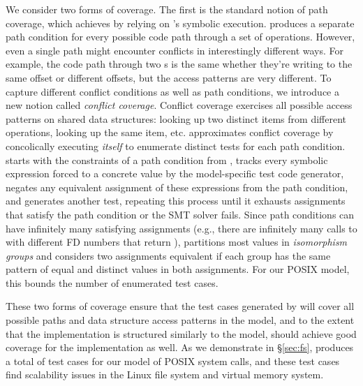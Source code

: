 We consider two forms of coverage.
The first is the standard notion of path coverage, which \generator{}
achieves by relying on \analyzer{}'s symbolic execution.
%
\analyzer{} produces a separate path condition for every possible code
path through a set of operations.
%
However, even a single path might encounter conflicts in interestingly
different ways.
%
For example, the code path through two s is the
same whether they're writing to the same offset or different offsets,
but the access patterns are very different.
%
To capture different conflict conditions as well as path conditions, we
introduce a new notion called \emph{conflict coverage}.  Conflict coverage
exercises all possible access patterns on shared data structures:
looking up two distinct items from different operations, looking up
the same item, etc.
%
\generator approximates
conflict coverage by concolically executing \emph{itself}
to enumerate distinct tests for each path condition.  \generator
starts with the constraints of a path condition from \analyzer, tracks
every symbolic expression forced to a concrete value by the
model-specific test code
generator, negates any equivalent assignment of these expressions from
the path condition, and generates another test, repeating this process
until it exhausts assignments that satisfy the path condition or the SMT
solver fails.  Since
path conditions can have infinitely many satisfying assignments (e.g.,
there are infinitely many calls to  with different FD numbers
that return ), \generator partitions most values in
\emph{isomorphism groups} and considers two assignments equivalent if
each group has the same
pattern of equal and distinct values in both assignments.  For our POSIX
model, this
bounds the number of enumerated test cases.

These two forms of coverage ensure that the test cases
generated by \generator{} will cover all possible paths and data structure
access patterns in the model, and to the extent that the implementation
is structured similarly to the model, should achieve good coverage
for the implementation as well.  As we demonstrate in \S\ref{sec:fs},
\generator{} produces a total of  test cases
for our model of  POSIX
system calls, and these
test cases find scalability issues in the Linux  file system
and virtual memory system.


\subsection{\mtrace{}}
\label{sec:model:mtrace}

